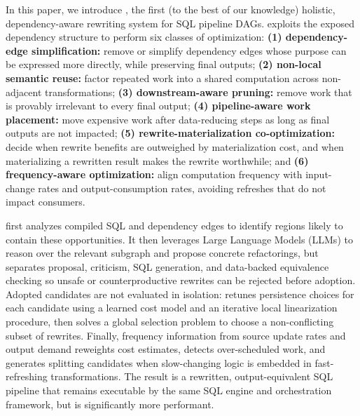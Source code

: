 In this paper, we introduce \tool, the first (to the best of our knowledge) holistic, dependency-aware rewriting system for SQL pipeline DAGs.  \tool exploits the exposed dependency structure to  perform six classes of optimization: \textbf{(1) dependency-edge simplification:} remove or simplify dependency edges whose purpose can be expressed more directly, while preserving final outputs; \textbf{(2) non-local semantic reuse:} factor repeated work into a shared computation across non-adjacent transformations; \textbf{(3) downstream-aware pruning:} remove work that is provably irrelevant to every final output; \textbf{(4) pipeline-aware work placement:} move expensive work after data-reducing steps as long as final outputs are not impacted; \textbf{(5) rewrite-materialization co-optimization:} decide when rewrite benefits are outweighed by materialization cost, and when materializing a rewritten result makes the rewrite worthwhile; and \textbf{(6) frequency-aware optimization:} align computation frequency with input-change rates and output-consumption rates, avoiding refreshes that do not impact consumers.

\tool first analyzes compiled SQL and dependency edges to identify regions likely to contain these opportunities. It then leverages Large Language Models (LLMs) to reason over the relevant subgraph and propose concrete refactorings, but separates proposal, criticism, SQL generation, and data-backed equivalence checking so unsafe or counterproductive rewrites can be rejected before adoption. Adopted candidates are not evaluated in isolation: \tool retunes persistence choices for each candidate using a learned cost model and an iterative local linearization procedure, then solves a global selection problem to choose a non-conflicting subset of rewrites. Finally, frequency information from source update rates and output demand reweights cost estimates, detects over-scheduled work, and generates splitting candidates when slow-changing logic is embedded in fast-refreshing transformations.
The result is a rewritten, output-equivalent SQL pipeline that remains executable by the same SQL engine and orchestration framework, but is significantly more performant.

